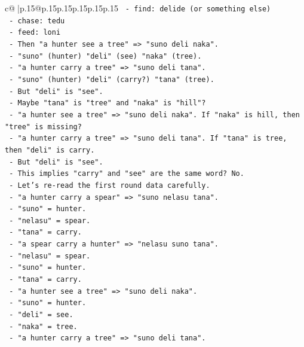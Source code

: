 \documentclass{article}
\begin{document}
{\begin{supertabular}{c@{$\;$}|p{.15\linewidth}@{}p{.15\linewidth}p{.15\linewidth}p{.15\linewidth}p{.15\linewidth}p{.15\linewidth}}
{{{\texttt{       {-} find: delide (or something else)} \\
\texttt{       {-} chase: tedu} \\
\texttt{       {-} feed: loni} \\
\texttt{     {-} Then "a hunter see a tree" => "suno deli naka".} \\
\texttt{       {-} "suno" (hunter) "deli" (see) "naka" (tree).} \\
\texttt{     {-} "a hunter carry a tree" => "suno deli tana".} \\
\texttt{       {-} "suno" (hunter) "deli" (carry?) "tana" (tree).} \\
\texttt{       {-} But "deli" is "see".} \\
\texttt{       {-} Maybe "tana" is "tree" and "naka" is "hill"?} \\
\texttt{       {-} "a hunter see a tree" => "suno deli naka". If "naka" is hill, then "tree" is missing?} \\
\texttt{       {-} "a hunter carry a tree" => "suno deli tana". If "tana" is tree, then "deli" is carry.} \\
\texttt{       {-} But "deli" is "see".} \\
\texttt{       {-} This implies "carry" and "see" are the same word? No.} \\
\texttt{     {-} Let's re{-}read the first round data carefully.} \\
\texttt{       {-} "a hunter carry a spear" => "suno nelasu tana".} \\
\texttt{         {-} "suno" = hunter.} \\
\texttt{         {-} "nelasu" = spear.} \\
\texttt{         {-} "tana" = carry.} \\
\texttt{       {-} "a spear carry a hunter" => "nelasu suno tana".} \\
\texttt{         {-} "nelasu" = spear.} \\
\texttt{         {-} "suno" = hunter.} \\
\texttt{         {-} "tana" = carry.} \\
\texttt{       {-} "a hunter see a tree" => "suno deli naka".} \\
\texttt{         {-} "suno" = hunter.} \\
\texttt{         {-} "deli" = see.} \\
\texttt{         {-} "naka" = tree.} \\
\texttt{       {-} "a hunter carry a tree" => "suno deli tana".} \\
}}}
\end{supertabular}}
\end{document}
